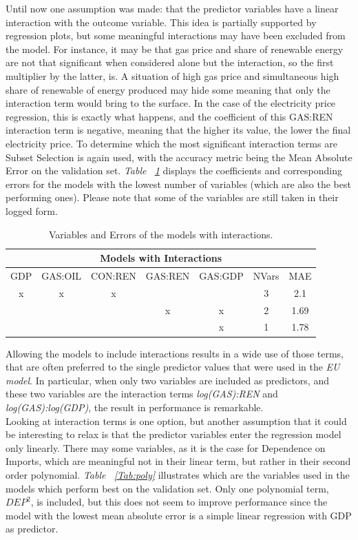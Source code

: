 \documentclass[a4paper,12pt]{book}
\begin{document}
Until now one assumption was made: that the predictor variables have a linear interaction with the outcome variable. This idea is partially supported by regression plots, but some meaningful interactions may have been excluded from the model. For instance, it may be that gas price and share of renewable energy are not that significant when considered alone but the interaction, so the first multiplier by the latter, is. A situation of high gas price and simultaneous high share of renewable of energy produced may hide some meaning that only the interaction term would bring to the surface. In the case of the electricity price regression, this is exactly what happens, and the coefficient of this GAS:REN interaction term is negative, meaning that the higher its value, the lower the final electricity price. To determine which the most significant interaction terms are Subset Selection is again used, with the accuracy metric being the Mean Absolute Error on the validation set. \textit{Table ~\ref{Tab:int}} displays the coefficients and corresponding errors for the models with the lowest number of variables (which are also the best performing ones). Please note that some of the variables are still taken in their logged form.

\begin{table}[tb]
\begin{center}
\begin{tabular}{|c|c|c|c|c|c|c|}
\hline
\multicolumn{7}{|c|}{Models with Interactions}\\
\hline
GDP&GAS:OIL&CON:REN&GAS:REN&GAS:GDP&NVars&MAE\\
\hline
x&x&x&&&3&2.1\\
&&&x&x&2&1.69\\
&&&&x&1&1.78\\
\hline
\end{tabular}
\caption{Variables and Errors of the models with interactions.}
\label{Tab:int}
\end{center}
\end{table}

Allowing the models to include interactions results in a wide use of those terms, that are often preferred to the single predictor values that were used in the \textit{EU model}. In particular, when only two variables are included as predictors, and these two variables are the interaction terms \textit{log(GAS):REN} and \textit{log(GAS):log(GDP)}, the result in performance is remarkable.\\

Looking at interaction terms is one option, but another assumption that it could be interesting to relax is that the predictor variables enter the regression model only linearly. There may some variables, as it is the case for Dependence on Imports, which are meaningful not in their linear term, but rather in their second order polynomial. \textit{Table ~\ref{Tab:poly}} illustrates which are the variables used in the models which perform best on the validation set. Only one polynomial term, $DEP^2$, is included, but this does not seem to improve performance since the model with the lowest mean absolute error is a simple linear regression with GDP as predictor.
\end{document}

